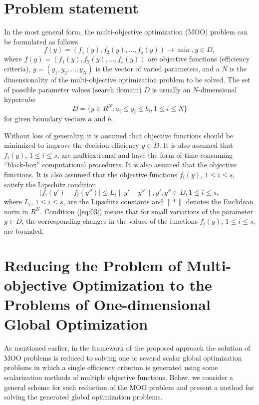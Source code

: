 \documentclass[runningheads]{llncs}
\begin{document}
\section{Problem statement} \label{sec:02}

In the most general form, the multi-objective optimization (MOO) problem can be formulated as follows
\begin{equation}
\label{eq:01}
f(y) = (f_1(y), f_2(y), \dots, f_s(y)) \to \min,  y\in D,
\end{equation}
where $f(y) = (f_1(y), f_2(y), \dots, f_s(y))$ are objective functions (efficiency criteria), $y = (y_1, y_2, \dots , y_N)$ is the vector of varied parameters, and a $N$ is the dimensionality of the multi-objective optimization problem to be solved. The set of possible parameter values (search domain) $D$ is usually an $N$-dimensional hypercube
\begin{equation}
\label{eq:02}
D  = \{ y\in R^N: a_i \leq y_i \leq b_i, 1 \leq i \leq N \}
\end{equation}
for given boundary vectors $a$ and $b$.

Without loss of generality, it is assumed that objective functions should be minimized to improve the decision efficiency $y \in D$. It is also assumed that $f_i(y)$, $1 \leq i \leq s$, are multiextremal and have the form of time-consuming ``black-box'' computational procedures. It is also assumed that the objective functions. It is also assumed that the objective functions $f_i(y)$, $1 \leq i \leq s$, satisfy the Lipschitz condition 
\begin{equation}
\label{eq:03}
|f_i(y') - f_i(y'')| \leq L_i\|y' - y''\|, y', y'' \in D, 1 \leq i \leq s,
\end{equation}
where $L_i$, $1 \leq i \leq s$, are the Lipschitz constants and $\|*\|$ denotes the Euclidean norm in $R^N$.  Condition (\ref{eq:03}) means that for small variations of the parameter $y \in D$, the corresponding changes in the values of the functions $f_i(y)$, $1 \leq i \leq s$, are bounded. 

\section{Reducing the Problem of Multi-objective Optimization to the Problems of One-dimensional Global Optimization} \label{sec:03}

As mentioned earlier, in the framework of the proposed approach the solution of MOO problems is reduced to solving one or several scalar global optimization problems in which a single efficiency criterion is generated using some scalarization methods of multiple objective functions. Below, we consider a general scheme for such reduction of the MOO problem and present a method for solving the generated global optimization problems.
\end{document}
